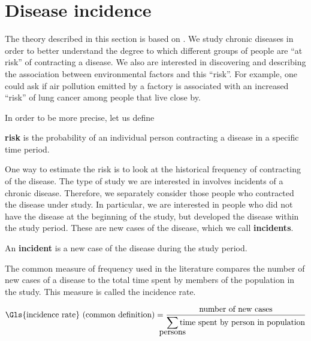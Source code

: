 

\section{Disease incidence}
\label{sec:theory:incidence}

The theory described in this section is based on \citet{rothman2008modern}.
We study chronic diseases in order to better understand the degree to which different groups of people are ``at risk'' of contracting a disease.
We also are interested in discovering and describing the association between environmental factors and this ``risk''.
For example, one could ask if air pollution emitted by a factory is associated with an increased ``risk'' of lung cancer among people that live close by.

In order to be more precise,
let us define

\begin{defn}
    \textbf{\Gls{risk}} is the probability of an individual person contracting a disease in a specific time period.
\end{defn}

One way to estimate the \gls{risk} is to look at the historical frequency of contracting of the disease.
The type of study we are interested in involves incidents of a chronic disease.
Therefore, we separately consider those people who contracted the disease under study.
In particular, we are interested in people who did not have the disease at the beginning of the study,
but developed the disease within the study period.
These are new cases of the disease, which we call \textbf{\glspl{incident}}.

\begin{defn}
    An \textbf{\gls{incident}} is a new case of the disease during the study period.
\end{defn}

The common measure of frequency used in the literature compares the number of new cases of a disease to the total time spent by members of the population in the study.
This measure is called the \gls{incidence rate}.

\begin{equation}
    \mbox{\Gls{incidence rate} (common definition)} = \frac{\mbox{number of new cases}}
                                {\displaystyle\smashoperator{\sum\limits_{\mbox{persons}}}\mbox{time spent by person in population}}
\end{equation}

